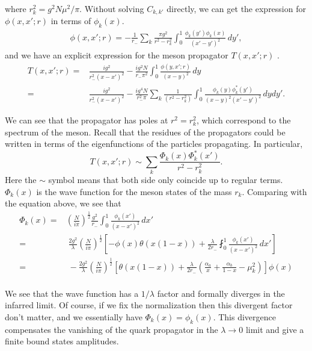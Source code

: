 \documentclass{article}
\begin{document}
where $r_{k}^{2}= g^{2}N \mu^{2}/\pi $.
Without solving $C_{k, k{}'}$ directly, we can get the expression for $\phi(x, x{}'; r)$ in terms of $\phi_{k}(x)$.
\begin{align*}
  \phi(x, x{}'; r) =  -\frac{1}{r_{-}}\sum_{k}\frac{\pi g^{2}}{r^{2}- r_{k}^{2}}\int_{0}^{1} \frac{\phi_{k}(y{}')\phi_{k}(x)}{(x{}'-y{}')^{2}}\, dy{}', 
\end{align*}
and we have an explicit expression for the meson propagator $T(x, x{}'; r)$ .
\begin{align*}
    T(x, x{}';r) =& \frac{ig^{2}}{r_{-}^{2}(x - x{}')^{2}} - \frac{ig^{2}N}{r_{-}\pi^{2}}\int_{0}^{1} \frac{\phi(y, x{}';r )}{(x-y)^{2}}\, dy\\
  =& \frac{ig^{2}}{r_{-}^{2}(x - x{}')^{2}} - \frac{ig^{4}N}{r_{-}^{2}\pi } \sum_{k}\frac{1}{(r^{2}- r_{k}^{2})}\int_{0}^{1} \frac{\phi_{k}(y)\phi^{*}_{k}(y{}')}{(x-y)^{2}(x{}'-y{}')^{2}}\, dydy{}'.
\end{align*}

We can see that the propagator has poles at $r^{2} = r_{k}^{2}$, which correspond to the spectrum of the meson. Recall that the residues of the propagators could be written in terms of the eigenfunctions of the particles propagating. In particular,
\[ 
    T(x, x{}';r) \sim  \sum_{k}\frac{\Phi_{k}(x)\Phi_{k}^{*}(x{}')}{r^{2} - r_{k}^{2}}.
\]
Here the $\sim $ symbol means that both side only coincide up to regular terms.
$\Phi_{k}(x)$ is the wave function for the meson states of the mass $r_{k}$. Comparing with the equation above, we see that 
\begin{align*}
  \Phi_{k}(x) =& \left(\frac{N}{i\pi}\right)^{\frac{1}{2}}\frac{g^{2}}{r_{-}} \int_{0}^{1} \frac{\phi_{k}(x{}')}{(x-x{}')^{2}}\, dx{}'\\
  =&\;  \frac{2g^2}{\lambda }\left(\frac{N}{i\pi}\right)^{\frac{1}{2}}\left[-\phi(x)\theta\left(x(1-x)\right) + \frac{\lambda}{2r_{-}}\fint_{0}^{1} \frac{\phi_{k}(x{}')}{(x-x{}')^{2}}\, dx{}'\right] \\
  =&\;  -\frac{2g^2}{\lambda }\left(\frac{N}{i\pi}\right)^{\frac{1}{2}}\left[\theta\left(x(1-x)\right) + \frac{\lambda}{2r_{-}}\left(\frac{\alpha_{a}}{x}+ \frac{\alpha_{b}}{1-x} -\mu_{k}^{2}\right)\right]\phi(x) \\
\end{align*}

We see that the wave function has a $1/\lambda $ factor and formally diverges in the infarred limit. Of course, if we fix the normalization then this divergent factor don't matter, and we essentially have $\Phi_{k}(x) = \phi_{k}(x)$. This divergence compensates the vanishing of the quark propagator in the $\lambda \rightarrow 0$ limit and give a finite bound states amplitudes.
\end{document}
